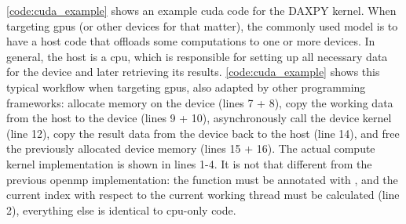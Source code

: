 \autoref{code:cuda_example} shows an example \gls{cuda} code for the DAXPY kernel. 
When targeting \glspl{gpu} (or other devices for that matter), the commonly used model is to have a host code that offloads some computations to one or more devices. 
In general, the host is a \gls{cpu}, which is responsible for setting up all necessary data for the device and later retrieving its results. 
\autoref{code:cuda_example} shows this typical workflow when targeting \glspl{gpu}, also adapted by other programming frameworks: allocate memory on the device (lines 7 + 8), copy the working data from the host to the device (lines 9 + 10), asynchronously call the device kernel (line 12), copy the result data from the device back to the host (line 14), and free the previously allocated device memory (lines 15 + 16). 
The actual compute kernel implementation is shown in lines 1-4. 
It is not that different from the previous \gls{openmp} implementation: the function must be annotated with , and the current index with respect to the current working thread must be calculated (line 2), everything else is identical to \gls{cpu}-only code. 


